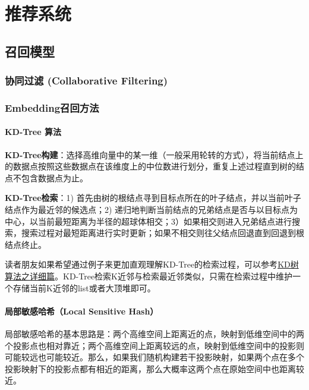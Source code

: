 \chapter{推荐系统}

\section{召回模型}

\subsection{协同过滤 (Collaborative Filtering)}

\subsection{Embedding召回方法}

\subsubsection{KD-Tree 算法}

\textcolor{importcolor}{\bfseries KD-Tree构建}：选择高维向量中的某一维（一般采用轮转的方式），将当前结点上的数据点按照这些数据点在该维度上的中位数进行划分，重复上述过程直到树的结点不包含数据点为止。

\textcolor{importcolor}{\bfseries KD-Tree检索}：1) 首先由树的根结点寻到目标点所在的叶子结点，并以当前叶子结点作为最近邻的候选点；2) 递归地判断当前结点的兄弟结点是否与以目标点为中心，以当前最短距离为半径的超球体相交；3）如果相交则进入兄弟结点进行搜索，搜索过程对最短距离进行实时更新；如果不相交则往父结点回退直到回退到根结点终止。

\begin{note}
  读者朋友如果希望通过例子来更加直观理解KD-Tree的检索过程，可以参考\href{https://zhuanlan.zhihu.com/p/23966698}{KD树算法之详细篇}。KD-Tree检索K近邻与检索最近邻类似，只需在检索过程中维护一个存储当前K近邻的list或者大顶堆即可。
\end{note}

\subsubsection{局部敏感哈希（Local Sensitive Hash）}

局部敏感哈希的基本思路是：两个高维空间上距离近的点，映射到低维空间中的两个投影点也相对靠近；两个高维空间上距离较远的点，映射到低维空间中的投影则可能较远也可能较近。那么，如果我们随机构建若干投影映射，如果两个点在多个投影映射下的投影点都有相近的距离，那么大概率这两个点在原始空间中也距离较近。

